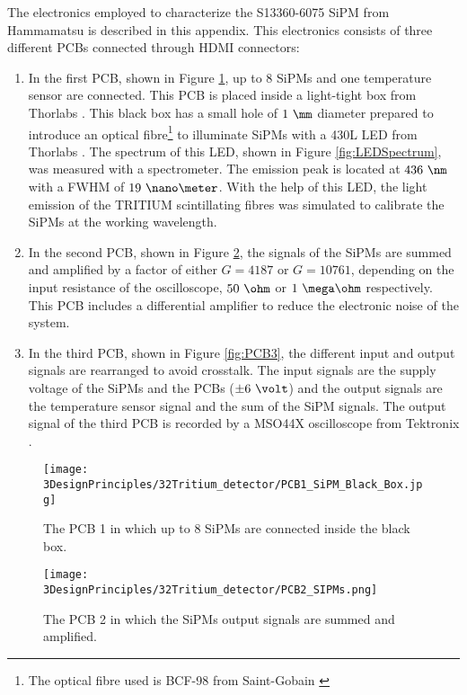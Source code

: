 The electronics employed to characterize the S13360-6075 SiPM from \newline Hammamatsu is described in this appendix. This electronics consists of three different PCBs connected through HDMI connectors:

\begin{enumerate}
\item{} In the first PCB, shown in Figure \ref{fig:PCB1}, up to 8 SiPMs and one temperature sensor are connected. This PCB is placed inside a light-tight box from Thorlabs \cite{ThorlabsCompany}. This black box has a small hole of $1~\mm$ diameter prepared to introduce an optical fibre\footnote{The optical fibre used is BCF-98 from Saint-Gobain \cite{OpticalFibers}} to illuminate SiPMs with a 430L LED from Thorlabs \cite{LEDThorlabs}. The spectrum of this LED, shown in Figure \ref{fig:LEDSpectrum}, was measured with a spectrometer. The emission peak is located at $436~\nm$ with a FWHM of $19~\nano\meter$. With the help of this LED, the light emission of the TRITIUM scintillating fibres was simulated to calibrate the SiPMs at the working wavelength. 

\item{} In the second PCB, shown in Figure \ref{fig:PCB2}, the signals of the SiPMs are summed and amplified by a factor of either $G=4187$ or $G=10761$, depending on the input resistance of the oscilloscope, $50~\ohm$ or $1~\mega\ohm$ respectively. This PCB includes a differential amplifier to reduce the electronic noise of the system.

\item{} In the third PCB, shown in Figure \ref{fig:PCB3}, the different input and output signals are rearranged to avoid crosstalk. The input signals are the supply voltage of the SiPMs and the PCBs ($\pm 6~\volt$) and the output signals are the temperature sensor signal and the sum of the SiPM signals. The output signal of the third PCB is recorded by a MSO44X oscilloscope from Tektronix \cite{Oscilloscope}.

\end{enumerate}

\begin{figure}[h]
\centering
\texttt{[image: 3DesignPrinciples/32Tritium\_detector/PCB1\_SiPM\_Black\_Box.jpg]}
\caption{The PCB 1 in which up to 8 SiPMs are connected inside the black box.\label{fig:PCB1}}
\end{figure}

\begin{figure}[h]
\centering
\texttt{[image: 3DesignPrinciples/32Tritium\_detector/PCB2\_SIPMs.png]}
\caption{The PCB 2 in which the SiPMs output signals are summed and amplified.\label{fig:PCB2}}
\end{figure}

